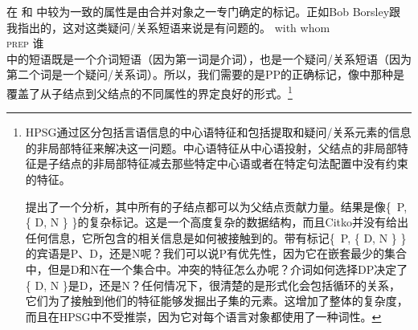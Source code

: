 在 和 中较为一致的属性是由合并对象之一专门确定的标记。正如Bob Borsley跟我指出的，这对这类疑问/关系短语来说是有问题的。
\ea
\gll with whom\\
\textsc{prep} 谁\\
\z
{}中的短语既是一个介词短语（因为第一词是介词），也是一个疑问/关系短语（因为第二个词是一个疑问/关系词）。所以，我们需要的是PP的正确标记，像中那种是覆盖了从子结点到父结点的不同属性的界定良好的形式。\footnote{%
HPSG通过区分包括言语信息的中心语特征和包括提取和疑问/关系元素的信息的非局部特征来解决这一问题。中心语特征从中心语投射，父结点的非局部特征是子结点的非局部特征减去那些特定中心语或者在特定句法配置中没有约束的特征。

 \citet[]{Citko2008a}提出了一个分析，其中所有的子结点都可以为父结点贡献力量。结果是像\{~P, \{ D, N \} \}的复杂标记。这是一个高度复杂的数据结构，而且Citko并没有给出任何信息，它所包含的相关信息是如何被接触到的。带有标记\{~P, \{ D, N \} \}的宾语是P、D，还是N呢？我们可以说P有优先性，因为它在嵌套最少的集合中，但是D和N在一个集合中。冲突的特征怎么办呢？介词如何选择DP决定了\{ D, N \}是D，还是N？任何情况下，很清楚的是形式化会包括循环的关系，它们为了接触到他们的特征能够发掘出子集的元素。这增加了整体的复杂度，而且在HPSG中不受推崇，因为它对每个语言对象都使用了一种词性。
}

